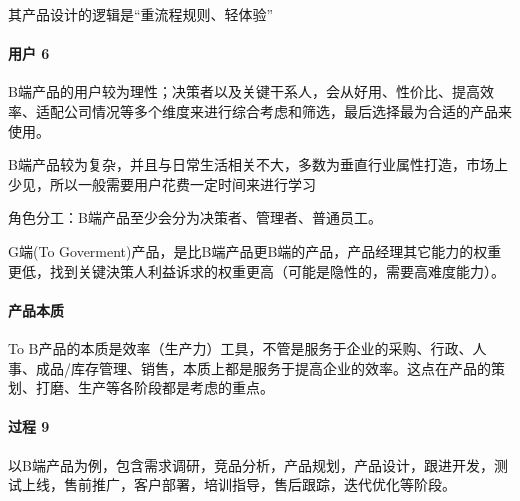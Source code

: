 \documentclass[letterpaper,11pt,english]{sphinxmanual}
\begin{document}
其产品设计的逻辑是“重流程规则、轻体验”
%
\begin{footnote}[15]\sphinxAtStartFootnote
{}
%
\end{footnote}


\paragraph{用户 6\sphinxfootnotemark[16]}
\label{\detokenize{chapter_introduction/2B:id2}}%
\begin{footnotetext}[16]\sphinxAtStartFootnote
{}
%
\end{footnotetext}\ignorespaces 
B端产品的用户较为理性；决策者以及关键干系人，会从好用、性价比、提高效率、适配公司情况等多个维度来进行综合考虑和筛选，最后选择最为合适的产品来使用。

B端产品较为复杂，并且与日常生活相关不大，多数为垂直行业属性打造，市场上少见，所以一般需要用户花费一定时间来进行学习

角色分工：B端产品至少会分为决策者、管理者、普通员工。

G端(To
Goverment)产品，是比B端产品更B端的产品，产品经理其它能力的权重更低，找到关键決策人利益诉求的权重更高（可能是隐性的，需要高难度能力）。%
\begin{footnote}[17]\sphinxAtStartFootnote
{}
%
\end{footnote}


\paragraph{产品本质}
\label{\detokenize{chapter_introduction/2B:id3}}
To
B产品的本质是效率（生产力）工具，不管是服务于企业的采购、行政、人事、成品/库存管理、销售，本质上都是服务于提高企业的效率。这点在产品的策划、打磨、生产等各阶段都是考虑的重点。


\paragraph{过程 9\sphinxfootnotemark[18]}
\label{\detokenize{chapter_introduction/2B:id4}}%
\begin{footnotetext}[18]\sphinxAtStartFootnote
{}
%
\end{footnotetext}\ignorespaces 
以B端产品为例，包含需求调研，竞品分析，产品规划，产品设计，跟进开发，测试上线，售前推广，客户部署，培训指导，售后跟踪，迭代优化等阶段。
\end{document}
